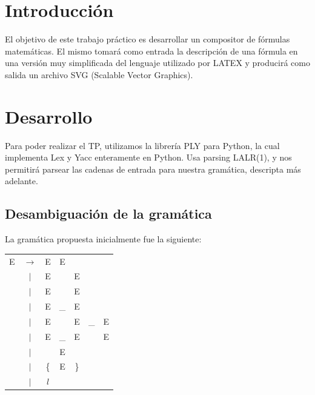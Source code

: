 \documentclass[a4paper, 10pt, twoside]{article}
\begin{document}
\newpage

\tableofcontents

\newpage


\section{Introducción}
El objetivo de este trabajo práctico es desarrollar un compositor de fórmulas matemáticas. El mismo tomará como entrada la descripción de una fórmula en una versión muy simplificada del lenguaje utilizado por LATEX y producirá como salida un archivo SVG (Scalable Vector Graphics).

\section{Desarrollo}
Para poder realizar el TP, utilizamos la librería PLY para Python, la cual implementa Lex y Yacc enteramente en Python. Usa parsing LALR(1), y nos permitirá parsear las cadenas de entrada para nuestra gramática, descripta más adelante.

\subsection{Desambiguación de la gramática}

La gramática propuesta inicialmente fue la siguiente:

\begin{table}[ht]
\begin{tabular} {c c c c c c c}

E & $\rightarrow$ & E & E                 &   & & \\
  & $|$           & E & \detokenize{/}    & E & & \\
  & $|$           & E & \detokenize{^}    & E & & \\
  & $|$           & E & \_                & E & & \\
  & $|$           & E & \detokenize{^}    & E & \_  & E \\
  & $|$           & E & \_                & E & \detokenize{^} & E \\
  & $|$           & \detokenize{(}        & E & \detokenize{)} & & \\
  & $|$           & \{                    & E & \} & & \\
  & $|$           & $l$ & & & & \\
\end{tabular}
\end{table}
\end{document}
